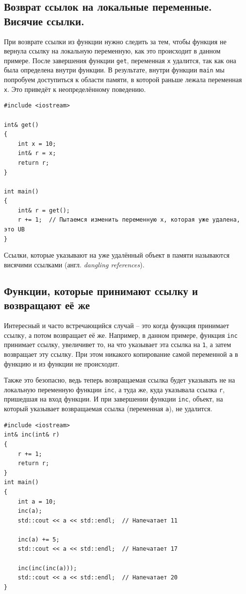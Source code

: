 \documentclass{article}
\begin{document}
\subsection*{Возврат ссылок на локальные переменные. Висячие ссылки.}
При возврате ссылки из функции нужно следить за тем, чтобы функция не вернула ссылку на локальную переменную, как это происходит в данном примере. После завершения функции \texttt{get}, переменная \texttt{x} удалится, так как она была определена внутри функции. В результате, внутри функции \texttt{main} мы попробуем доступиться к области памяти, в которой раньше лежала переменная \texttt{x}. Это приведёт к неопределённому поведению.
\begin{lstlisting}
#include <iostream>

int& get() 
{
    int x = 10;
    int& r = x;
    return r;
}

int main() 
{
    int& r = get();
    r += 1;  // Пытаемся изменить переменную x, которая уже удалена, это UB
}
\end{lstlisting}

Ссылки, которые указывают на уже удалённый объект в памяти называются висячими ссылками (англ. \textit{dangling references}).

\newpage
\subsection*{Функции, которые принимают ссылку и возвращают её же}
Интересный и часто встречающийся случай -- это когда функция принимает ссылку, а потом возвращает её же. Например, в данном примере, функция \texttt{inc} принимает ссылку, увеличивет то, на что указывает эта ссылка на \texttt{1}, а затем возвращает эту ссылку. При этом никакого копирование самой переменной \texttt{a} в функцию и из функции не происходит.

Также это безопасно, ведь теперь возвращаемая ссылка будет указывать не на локальную переменную функции \texttt{inc}, а туда же, куда указывала ссылка \texttt{r}, пришедшая на вход функции. И при завершении функции \texttt{inc}, объект, на который указывает возвращаемая ссылка (переменная \texttt{a}), не удалится.
\begin{lstlisting}
#include <iostream>
int& inc(int& r) 
{
    r += 1;
    return r;
}
int main() 
{
    int a = 10;
    inc(a);
    std::cout << a << std::endl;  // Напечатает 11
    
    inc(a) += 5;
    std::cout << a << std::endl;  // Напечатает 17
    
    inc(inc(inc(a)));
    std::cout << a << std::endl;  // Напечатает 20
}
\end{lstlisting}
\end{document}
